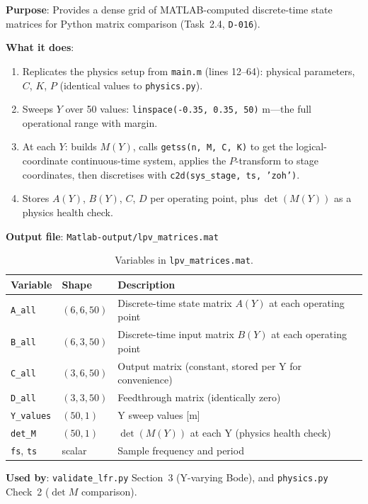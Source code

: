 \documentclass[11pt,a4paper]{article}
\newcommand{\decref}[1]{\texttt{D-#1}}
\newcommand{\pyfile}[1]{\texttt{#1}}
\begin{document}
\textbf{Purpose}: Provides a dense grid of MATLAB-computed discrete-time state matrices for
Python matrix comparison (Task~2.4, \decref{016}).

\textbf{What it does}:
\begin{enumerate}[nosep]
\item Replicates the physics setup from \texttt{main.m} (lines 12--64): physical parameters,
  $C$, $K$, $P$ (identical values to \pyfile{physics.py}).
\item Sweeps $Y$ over 50 values: \texttt{linspace(-0.35, 0.35, 50)} m---the full operational
  range with margin.
\item At each $Y$: builds $M(Y)$, calls \texttt{getss(n, M, C, K)} to get the logical-coordinate
  continuous-time system, applies the $P$-transform to stage coordinates, then discretises with
  \texttt{c2d(sys\_stage, ts, 'zoh')}.
\item Stores $A(Y)$, $B(Y)$, $C$, $D$ per operating point, plus $\det(M(Y))$ as a
  physics health check.
\end{enumerate}

\textbf{Output file}: \texttt{Matlab-output/lpv\_matrices.mat}

\begin{table}[ht]
\centering
\caption{Variables in \texttt{lpv\_matrices.mat}.}
\label{tab:lpv_matrices}
\begin{tabular}{lll}
\toprule
Variable & Shape & Description \\
\midrule
\texttt{A\_all}   & $(6,6,50)$ & Discrete-time state matrix $A(Y)$ at each operating point \\
\texttt{B\_all}   & $(6,3,50)$ & Discrete-time input matrix $B(Y)$ at each operating point \\
\texttt{C\_all}   & $(3,6,50)$ & Output matrix (constant, stored per Y for convenience) \\
\texttt{D\_all}   & $(3,3,50)$ & Feedthrough matrix (identically zero) \\
\texttt{Y\_values} & $(50,1)$  & Y sweep values [m] \\
\texttt{det\_M}   & $(50,1)$  & $\det(M(Y))$ at each Y (physics health check) \\
\texttt{fs}, \texttt{ts} & scalar & Sample frequency and period \\
\bottomrule
\end{tabular}
\end{table}

\textbf{Used by}: \pyfile{validate\_lfr.py} Section~3 (Y-varying Bode), and
\pyfile{physics.py} Check~2 ($\det M$ comparison).
\end{document}

